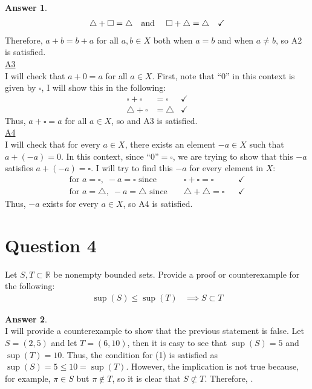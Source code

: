 \documentclass[10pt,a4paper]{article}
\theoremstyle{definition}
\newtheorem*{answer*}{Answer}
\begin{document}
\begin{answer*}{$ $}
\begin{align*}
\triangle + \square = \triangle &\text{\quad and \quad} \square + \triangle = \triangle &\checkmark
\end{align*}
Therefore, $a + b = b + a$ for all $a, b \in X$ both when $a = b$ and when $a \neq b$, so A2 is satisfied. 
\\\underline{A3}
\\I will check that $a + 0 = a$ for all $a \in X$. First, note that \enquote{0} in this context is given by $\square$, I will show this in the following:
\begin{align*}
\square + \square &= \square &\checkmark\\
\triangle + \square &= \triangle &\checkmark
\end{align*}
Thus, $a + \square = a$ for all $a \in X$, so  and A3 is satisfied. 
\\\underline{A4}
\\I will check that for every $a \in X$, there exists an element $-a \in X$ such that $a + (-a) = 0$. In this context, since \enquote{0}$ = \square$, we are trying to show that this $-a$ satisfies $a + (-a) = \square$. I will try to find this $-a$ for every element in $X$:
\begin{align*}
\text{for } a = \square,\; -a = \square \text{ since } && \square + \square = \square &&\checkmark\\
\text{for } a = \triangle,\; -a = \triangle \text{ since } && \triangle + \triangle = \square &&\checkmark
\end{align*}
Thus, $-a$ exists for every $a \in X$, so A4 is satisfied. 
\end{answer*}

\newpage

\section*{Question 4}
Let $S, T \subset \mathbb{R}$ be nonempty bounded sets. Provide a proof or counterexample for the following:
\begin{align}
\sup(S) \leq \sup(T) &\implies S \subset T
\end{align}

\begin{answer*}{$ $}
\\I will provide a counterexample to show that the previous statement is false. Let $S = (2, 5)$ and let $T = (6, 10)$, then it is easy to see that $\sup(S) = 5$ and $\sup(T) = 10$. Thus, the condition for (1) is satisfied as $\sup(S) = 5 \leq 10 = \sup(T)$. However, the implication is not true because, for example, $\pi \in S$ but $\pi \not\in T$, so it is clear that $S \not\subset T$. Therefore, .
\end{answer*}
\end{document}
